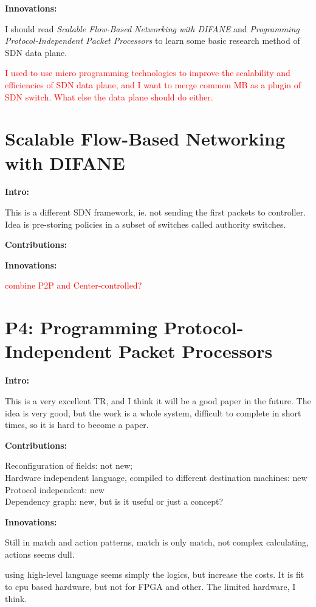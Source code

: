 \noindent
\textbf{Innovations:}

I should read \emph{Scalable Flow-Based Networking with DIFANE} and \emph{Programming Protocol-Independent Packet Processors} to learn some basic research method of SDN data plane.

\textcolor{red}{I used to use micro programming technologies to improve the scalability and efficiencies of SDN data plane, and I want to merge common MB as a plugin of SDN switch. What else the data plane should do either.}

\section{Scalable Flow-Based Networking with DIFANE}
\label{sec:7}

\textbf{Intro:}

This is a different SDN framework, ie. not sending the first packets to controller. Idea is pre-storing policies in a subset of switches called authority switches.

\noindent
\textbf{Contributions:}

\noindent
\textbf{Innovations:}

\textcolor{red}{combine P2P and Center-controlled?} 

\section{P4: Programming Protocol-Independent Packet Processors}
\label{sec:8}

\textbf{Intro:}

This is a very excellent TR, and I think it will be a good paper in the future. The idea is very good, but the work is a whole system, difficult to complete in short times, so it is hard to become a paper.

\textbf{Contributions:}

Reconfiguration of fields: not new;\\
Hardware independent language, compiled to different destination machines: new\\
Protocol independent: new \\
Dependency graph: new, but is it useful or just a concept?

\textbf{Innovations:}

Still in match and action patterns, match is only match, not complex calculating, actions seems dull.

using high-level language seems simply the logics, but increase the costs. It is fit to cpu based hardware, but not for FPGA and other. The limited hardware, I think.

